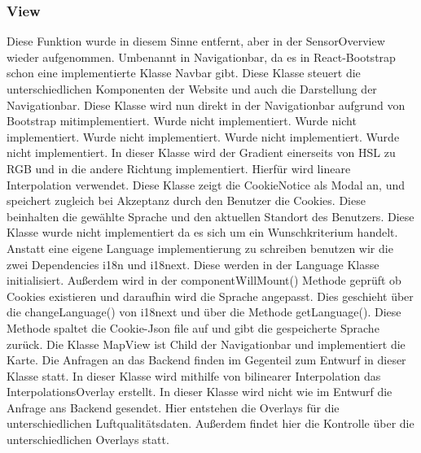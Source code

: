 \subsubsection{View}
    Diese Funktion wurde in diesem Sinne entfernt, aber in der SensorOverview wieder aufgenommen.
    Umbenannt in Navigationbar, da es in React-\gls{Bootstrap} schon eine implementierte Klasse Navbar gibt.
    Diese Klasse steuert die unterschiedlichen Komponenten der Website und auch die Darstellung der Navigationbar.
    \removedClass
    Diese Klasse wird nun direkt in der Navigationbar aufgrund von \gls{Bootstrap} mitimplementiert.
    \removedClass
{}
    Wurde nicht implementiert. 
Wurde nicht implementiert. 
Wurde nicht implementiert. 
Wurde nicht implementiert. 
Wurde nicht implementiert. 
    In dieser Klasse wird der Gradient einerseits von HSL zu RGB und in die andere Richtung implementiert. Hierfür wird lineare Interpolation verwendet.
    Diese Klasse zeigt die \gls{Cookie}Notice als Modal an, und speichert zugleich bei Akzeptanz durch den Benutzer die \gls{Cookie}s.
    Diese beinhalten die gewählte Sprache und den aktuellen Standort des Benutzers.
    Diese Klasse wurde nicht implementiert da es sich um ein Wunschkriterium handelt.
    Anstatt eine eigene Language implementierung zu schreiben benutzen wir die zwei Dependencies i18n und i18next.
    Diese werden in der Language Klasse initialisiert. 
    Außerdem wird in der componentWillMount() Methode geprüft ob \gls{Cookie}s existieren und daraufhin wird die Sprache angepasst. Dies geschieht über die changeLanguage() von i18next und über die Methode getLanguage().
    Diese Methode spaltet die \gls{Cookie}-Json file auf und gibt die gespeicherte Sprache zurück.
    Die Klasse MapView ist Child der Navigationbar und implementiert die Karte. Die Anfragen an das Backend finden im Gegenteil zum Entwurf in dieser Klasse statt. 
    \removedClass
{}
    In dieser Klasse wird mithilfe von bilinearer Interpolation das InterpolationsOverlay erstellt.
    In dieser Klasse wird nicht wie im Entwurf die Anfrage ans Backend gesendet. Hier entstehen die Overlays für die unterschiedlichen Luftqualitätsdaten.
    Außerdem findet hier die Kontrolle über die unterschiedlichen Overlays statt.

